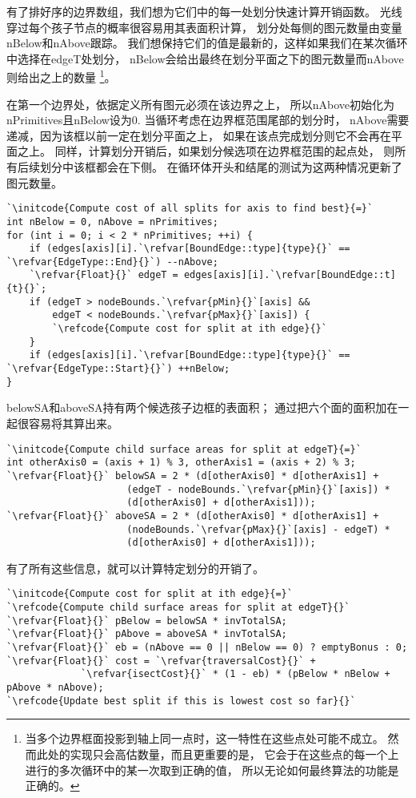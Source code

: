 有了排好序的边界数组，我们想为它们中的每一处划分快速计算开销函数。
光线穿过每个孩子节点的概率很容易用其表面积计算，
划分处每侧的图元数量由变量{\ttfamily nBelow}和{\ttfamily nAbove}跟踪。
我们想保持它们的值是最新的，这样如果我们在某次循环中选择在{\ttfamily edgeT}处划分，
{\ttfamily nBelow}会给出最终在划分平面之下的图元数量而{\ttfamily nAbove}则给出之上的数量
\footnote{当多个边界框面投影到轴上同一点时，这一特性在这些点处可能不成立。
然而此处的实现只会高估数量，而且更重要的是，
它会于在这些点的每一个上进行的多次循环中的某一次取到正确的值，
所以无论如何最终算法的功能是正确的。}。

在第一个边界处，依据定义所有图元必须在该边界之上，
所以{\ttfamily nAbove}初始化为{\ttfamily nPrimitives}且{\ttfamily nBelow}设为0.
当循环考虑在边界框范围尾部的划分时，
{\ttfamily nAbove}需要递减，因为该框以前一定在划分平面之上，
如果在该点完成划分则它不会再在平面之上。
同样，计算划分开销后，如果划分候选项在边界框范围的起点处，
则所有后续划分中该框都会在下侧。
在循环体开头和结尾的测试为这两种情况更新了图元数量。
\begin{lstlisting}
`\initcode{Compute cost of all splits for axis to find best}{=}`
int nBelow = 0, nAbove = nPrimitives;
for (int i = 0; i < 2 * nPrimitives; ++i) {
    if (edges[axis][i].`\refvar[BoundEdge::type]{type}{}` == `\refvar{EdgeType::End}{}`) --nAbove;
    `\refvar{Float}{}` edgeT = edges[axis][i].`\refvar[BoundEdge::t]{t}{}`;
    if (edgeT > nodeBounds.`\refvar{pMin}{}`[axis] &&
        edgeT < nodeBounds.`\refvar{pMax}{}`[axis]) {
        `\refcode{Compute cost for split at ith edge}{}`
    }
    if (edges[axis][i].`\refvar[BoundEdge::type]{type}{}` == `\refvar{EdgeType::Start}{}`) ++nBelow;
}
\end{lstlisting}

{\ttfamily belowSA}和{\ttfamily aboveSA}持有两个候选孩子边框的表面积；
通过把六个面的面积加在一起很容易将其算出来。
\begin{lstlisting}
`\initcode{Compute child surface areas for split at edgeT}{=}`
int otherAxis0 = (axis + 1) % 3, otherAxis1 = (axis + 2) % 3;
`\refvar{Float}{}` belowSA = 2 * (d[otherAxis0] * d[otherAxis1] +
                     (edgeT - nodeBounds.`\refvar{pMin}{}`[axis]) * 
                     (d[otherAxis0] + d[otherAxis1]));
`\refvar{Float}{}` aboveSA = 2 * (d[otherAxis0] * d[otherAxis1] +
                     (nodeBounds.`\refvar{pMax}{}`[axis] - edgeT) * 
                     (d[otherAxis0] + d[otherAxis1]));
\end{lstlisting}

有了所有这些信息，就可以计算特定划分的开销了。
\begin{lstlisting}
`\initcode{Compute cost for split at ith edge}{=}`
`\refcode{Compute child surface areas for split at edgeT}{}`
`\refvar{Float}{}` pBelow = belowSA * invTotalSA; 
`\refvar{Float}{}` pAbove = aboveSA * invTotalSA;
`\refvar{Float}{}` eb = (nAbove == 0 || nBelow == 0) ? emptyBonus : 0;
`\refvar{Float}{}` cost = `\refvar{traversalCost}{}` + 
             `\refvar{isectCost}{}` * (1 - eb) * (pBelow * nBelow + pAbove * nAbove);
`\refcode{Update best split if this is lowest cost so far}{}`
\end{lstlisting}

